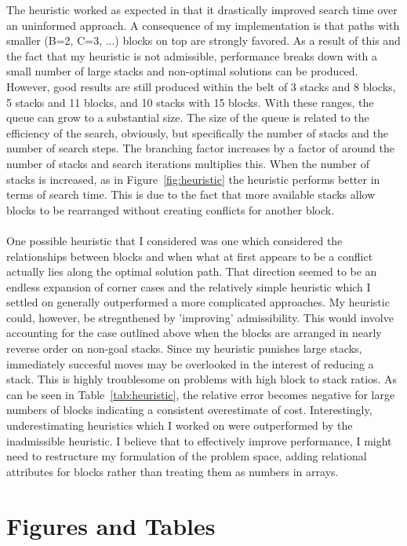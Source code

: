 \documentclass{article}
\begin{document}
The heuristic worked as expected in that it drastically improved search time
over an uninformed approach. A consequence of my implementation is that paths
with smaller (B=2, C=3, ...) blocks on top are strongly favored. As a result of
this and the fact that my heuristic is not admissible, performance breaks down 
with a small number of large stacks and non-optimal solutions can be produced.
However, good results are still produced within the belt of 3 stacks and 8
blocks, 5 stacks and 11 blocks, and 10 stacks with 15 blocks. With these ranges,
the queue can grow to a substantial size. The size of the queue is related to the
efficiency of the search, obviously, but specifically the number of stacks and
the number of search steps. The branching factor increases by a factor of
around the number of stacks and search iterations multiplies this.
When the number of stacks is increased, as in Figure~\ref{fig:heuristic} the 
heuristic performs better in terms of search time. This is due to the fact that 
more available stacks allow blocks to be rearranged without creating conflicts
for another block.\\\\ 
One possible heuristic that I considered was one which
considered the relationships between blocks and when what at first appears to be
a conflict actually lies along the optimal solution path. That direction seemed
to be an endless expansion of corner cases and the relatively simple heuristic
which I settled on generally outperformed a more complicated approaches. My
heuristic could, however, be stregnthened by 'improving' admissibility. This would
involve accounting for the case outlined above when the blocks are arranged in
nearly reverse order on non-goal stacks. Since my heuristic punishes large
stacks, immediately succesful moves may be overlooked in the interest of
reducing a stack. This is highly troublesome on problems with high block to
stack ratios. As can be seen in
Table~\ref{tab:heuristic}, the relative error becomes negative for large numbers
of blocks indicating a consistent overestimate of cost. Interestingly,
underestimating heuristics which I worked on were outperformed by the
inadmissible heuristic. I believe that to effectively improve performance, I
might need to restructure my formulation of the problem space, adding relational
attributes for blocks rather than treating them as numbers in arrays.

\section{Figures and Tables}
\end{document}
